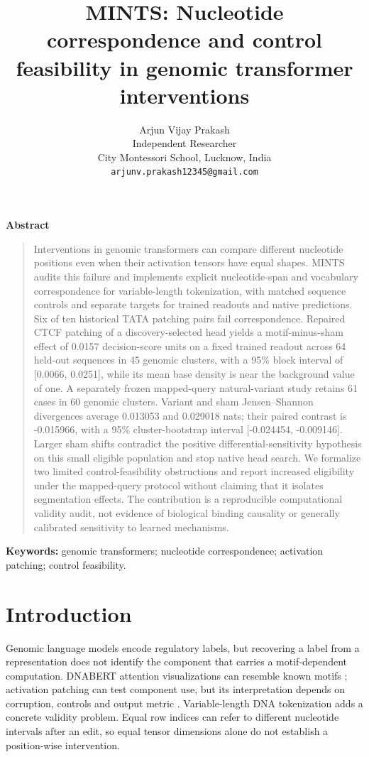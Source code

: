 \documentclass[10pt,letterpaper]{article}
\title{MINTS: Nucleotide correspondence and control feasibility in genomic transformer interventions}
\author{Arjun Vijay Prakash\\Independent Researcher\\City Montessori School, Lucknow, India\\\texttt{arjunv.prakash12345@gmail.com}}\date{}
\renewenvironment{abstract}{\begin{center}\bfseries Abstract\end{center}\begin{quote}\normalsize}{\end{quote}}
\begin{document}
\maketitle
\begin{abstract}
Interventions in genomic transformers can compare different nucleotide positions even when their activation tensors have equal shapes. MINTS audits this failure and implements explicit nucleotide-span and vocabulary correspondence for variable-length tokenization, with matched sequence controls and separate targets for trained readouts and native predictions. Six of ten historical TATA patching pairs fail correspondence. Repaired CTCF patching of a discovery-selected head yields a motif-minus-sham effect of 0.0157 decision-score units on a fixed trained readout across 64 held-out sequences in 45 genomic clusters, with a 95\% block interval of [0.0066, 0.0251], while its mean base density is near the background value of one. A separately frozen mapped-query natural-variant study retains 61 cases in 60 genomic clusters. Variant and sham Jensen--Shannon divergences average 0.013053 and 0.029018 nats; their paired contrast is -0.015966, with a 95\% cluster-bootstrap interval [-0.024454, -0.009146]. Larger sham shifts contradict the positive differential-sensitivity hypothesis on this small eligible population and stop native head search. We formalize two limited control-feasibility obstructions and report increased eligibility under the mapped-query protocol without claiming that it isolates segmentation effects. The contribution is a reproducible computational validity audit, not evidence of biological binding causality or generally calibrated sensitivity to learned mechanisms.
\end{abstract}
\noindent\textbf{Keywords:} genomic transformers; nucleotide correspondence; activation patching; control feasibility.
\section{Introduction}
Genomic language models encode regulatory labels, but recovering a label from a representation does not identify the component that carries a motif-dependent computation. DNABERT attention visualizations can resemble known motifs \citep{ji2021dnabert}; activation patching can test component use, but its interpretation depends on corruption, controls and output metric \citep{heimersheim2024patching,zhang2024metrics}. Variable-length DNA tokenization adds a concrete validity problem. Equal row indices can refer to different nucleotide intervals after an edit, so equal tensor dimensions alone do not establish a position-wise intervention.
\end{document}
